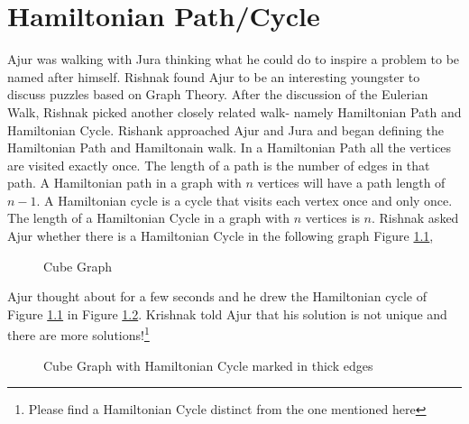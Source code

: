 \chapter{Hamiltonian Path/Cycle}
Ajur was walking with Jura thinking what he could do to inspire a problem to be named after himself. Rishnak found Ajur to be an interesting youngster to discuss puzzles based on Graph Theory. After the discussion of the Eulerian Walk, Rishnak picked another closely related walk- namely Hamiltonian Path and Hamiltonian Cycle. Rishank approached Ajur and Jura and began defining the Hamiltonian Path and Hamiltonain walk.
In a Hamiltonian Path all the vertices are visited exactly once. 
The length of a path is the number of edges in that path. A Hamiltonian path in a graph with $n$ vertices will have a path length of $n-1$. A Hamiltonian cycle is a cycle that visits each vertex once and only once. The length of a Hamiltonian Cycle in a graph with $n$ vertices is $n$. Rishnak asked Ajur whether there is a Hamiltonian Cycle in the following graph Figure \ref{5g1},
\begin{figure}
\begin{center}
\caption{ Cube Graph }\label{5g1}
\end{center}
\end{figure}

Ajur thought about for a few seconds and he drew the Hamiltonian cycle of Figure \ref{5g1} in Figure \ref {5g2}. Krishnak told Ajur that his solution is not unique and there are more solutions!\footnote{Please find a Hamiltonian Cycle distinct from the one mentioned here}

\begin{figure}
\begin{center}
\caption{ Cube Graph with Hamiltonian  Cycle marked in thick edges}\label{5g2}
\end{center}
\end{figure}

